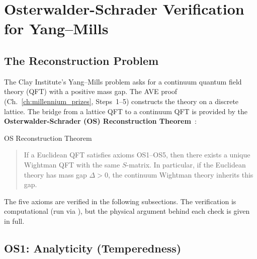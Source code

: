 \section{Osterwalder-Schrader Verification for Yang--Mills}
\label{sec:os_verification}

\subsection{The Reconstruction Problem}

The Clay Institute's Yang--Mills problem asks for a continuum quantum field
theory (QFT) with a positive mass gap.  The AVE proof (Ch.~\ref{ch:millennium_prizes},
Steps~1--5) constructs the theory on a discrete lattice.  The bridge from a
lattice QFT to a continuum QFT is provided by the
\textbf{Osterwalder-Schrader (OS) Reconstruction Theorem}~\cite{OS1973,OS1975}:

\begin{resultbox}{OS Reconstruction Theorem}
\begin{quote}
    If a Euclidean QFT satisfies axioms OS1--OS5, then there exists a unique
    Wightman QFT with the same $S$-matrix.  In particular, if the Euclidean
    theory has mass gap $\Delta > 0$, the continuum Wightman theory inherits
    this gap.
\end{quote}
\end{resultbox}

The five axioms are verified in the following subsections.  The verification
is computational (run via ),
but the physical argument behind each check is given in full.

\subsection{OS1: Analyticity (Temperedness)}

